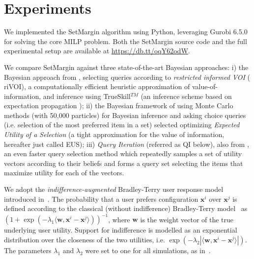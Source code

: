 \documentclass{article}
\renewcommand\[{\begin{equation}}
\renewcommand\]{\end{equation}}
\newcommand{\vecvar}[1]{\ensuremath{\boldsymbol{#1}}}
\newcommand{\vw}{\vecvar{w}}
\newcommand{\vx}{\vecvar{x}}
\begin{document}
\section{Experiments}
\label{sec:experiments}

We implemented the {\sc SetMargin} algorithm using Python, leveraging Gurobi
6.5.0 for solving the core MILP problem. Both the {\sc SetMargin} source code
and the full experimental setup are available at \url{https://db.tt/oqY62odW}.

We compare {\sc SetMargin} against three state-of-the-art Bayesian
approaches: i) the Bayesian approach from \cite{guo2010real},
selecting queries according to {\em restricted informed VOI} ({\sc
  riVOI}), a computationally efficient heuristic approximation of
value-of-information, and inference using TrueSkill$^{TM}$
\cite{HerbrichMG06} (an inference scheme based on expectation
propagation \cite{Minka01}); ii) the Bayesian framework of
\cite{viappiani2010optimal} using Monte Carlo methods (with 50,000
particles) for Bayesian inference and asking choice queries
(i.e. selection of the most preferred item in a set) selected
optimizing {\em Expected Utility of a Selection} (a tight
approximation for the value of information, hereafter just called {\sc
  EUS}); iii) {\em Query Iteration} (referred as {\sc QI} below), also
from \cite{viappiani2010optimal}, an even faster query selection
method which repeatedly samples a set of utility vectors according to
their beliefs and forms a query set selecting the items that maximize
utility for each of the vectors.

We adopt the {\em indifference-augmented} Bradley-Terry user response
model introduced in~\cite{guo2010real}. The probability that a user
prefers configuration $\vx^i$ over $\vx^j$ is defined according to the
classical (without indifference) Bradley-Terry model~\cite{BraTer52} as
$ (1 + \exp(-\lambda_1 \langle\vw,\vx^i - \vx^j\rangle))^{-1} $,
where $\vw$ is the weight vector of the true underlying user utility.
Support for indifference is modelled as an exponential distribution
over the closeness of the two utilities, i.e. 
$ \exp(-\lambda_2 |\langle\vw,\vx^i - \vx^j\rangle|).$
The parameters $\lambda_1$ and $\lambda_2$ were set to one for all
simulations, as in~\cite{guo2010real}.
\end{document}
